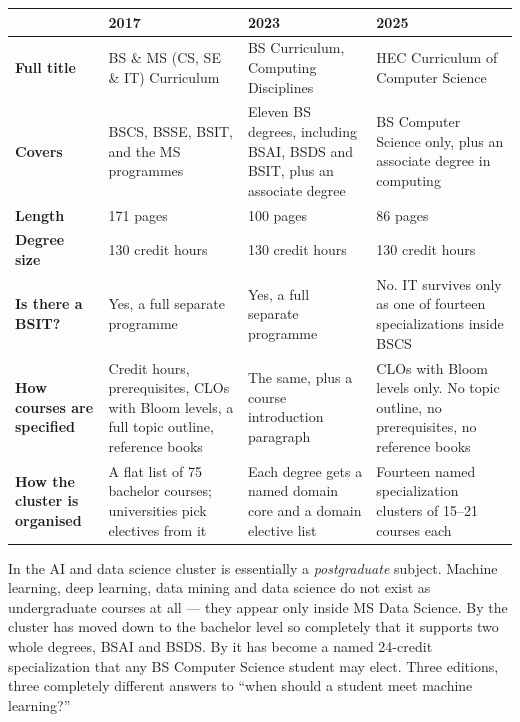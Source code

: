 \documentclass[11pt,a4paper,oneside]{report}
\begin{document}
\begin{longtable}{@{}L{1.9cm}L{4.5cm}L{4.4cm}L{4.5cm}@{}}
\toprule
{}
\textbf{} & \textbf{\color{ed2017}2017} & \textbf{\color{ed2023}2023} & \textbf{\color{ed2025}2025} \\
\midrule
\endhead
\textbf{Full title} &
BS \& MS (CS, SE \& IT) Curriculum &
BS Curriculum, Computing Disciplines &
HEC Curriculum of Computer Science \\
\textbf{Covers} &
BSCS, BSSE, BSIT, and the MS programmes &
Eleven BS degrees, including BSAI, BSDS and BSIT, plus an associate degree &
BS Computer Science only, plus an associate degree in computing \\
\textbf{Length} & 171 pages & 100 pages & 86 pages \\
\textbf{Degree size} & 130 credit hours & 130 credit hours & 130 credit hours \\
\textbf{Is there a BSIT?} &
Yes, a full separate programme &
Yes, a full separate programme &
No. IT survives only as one of fourteen specializations inside BSCS \\
\textbf{How courses are specified} &
Credit hours, prerequisites, CLOs with Bloom levels, a full topic outline, reference books &
The same, plus a course introduction paragraph &
CLOs with Bloom levels only. No topic outline, no prerequisites, no reference books \\
\textbf{How the cluster is organised} &
A flat list of 75 bachelor courses; universities pick electives from it &
Each degree gets a named domain core and a domain elective list &
Fourteen named specialization clusters of 15--21 courses each \\
\bottomrule
\end{longtable}

\begin{finding}
In  the AI and data science cluster is essentially a \emph{postgraduate}
subject. Machine learning, deep learning, data mining and data science do not
exist as undergraduate courses at all --- they appear only inside MS Data
Science. By  the cluster has moved down to the bachelor level so
completely that it supports two whole degrees, BSAI and BSDS. By  it
has become a named 24-credit specialization that any BS Computer Science student
may elect. Three editions, three completely different answers to ``when should a
student meet machine learning?''
\end{finding}
\end{document}
